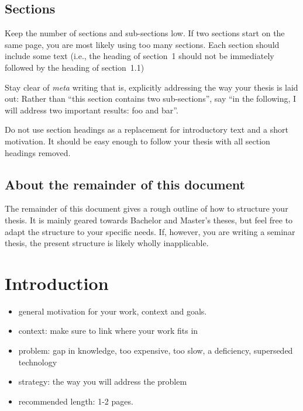 \documentclass[]{nsm-thesis}
\begin{document}
\section{Sections}

Keep the number of sections and sub-sections low.
If two sections start on the same page, you are most likely using too many sections.
Each section should include some text (i.e., the heading of section~1 should not be immediately followed by the heading of section~1.1)

Stay clear of \emph{meta} writing that is, explicitly addressing the way your thesis is laid out:
Rather than \enquote{this section contains two sub-sections}, say \enquote{in the following, I will address two important results: foo and bar}.

Do not use section headings as a replacement for introductory text and a short motivation.
It should be easy enough to follow your thesis with all section headings removed.


\section{About the remainder of this document}

The remainder of this document gives a rough outline of how to structure your thesis.
It is mainly geared towards Bachelor and Master's theses, but feel free to adapt the structure to your specific needs.
If, however, you are writing a seminar thesis, the present structure is likely wholly inapplicable.


\chapter{Introduction}
\label{sec:introduction}

\begin{itemize}
\item general motivation for your work, context and goals.
\item context: make sure to link where your work fits in
\item problem: gap in knowledge, too expensive, too slow, a deficiency, superseded technology
\item strategy: the way you will address the problem
\item recommended length: 1-2 pages.
\end{itemize}
\end{document}
